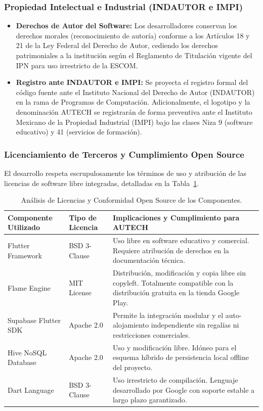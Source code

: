 \subsubsection{Propiedad Intelectual e Industrial (INDAUTOR e IMPI)}
\begin{itemize}
    \item \textbf{Derechos de Autor del Software:} Los desarrolladores conservan los derechos morales (reconocimiento de autoría) conforme a los Artículos 18 y 21 de la Ley Federal del Derecho de Autor, cediendo los derechos patrimoniales a la institución según el Reglamento de Titulación vigente del IPN para uso irrestricto de la ESCOM.
    \item \textbf{Registro ante INDAUTOR e IMPI:} Se proyecta el registro formal del código fuente ante el Instituto Nacional del Derecho de Autor (INDAUTOR) en la rama de Programas de Computación. Adicionalmente, el logotipo y la denominación AUTECH se registrarán de forma preventiva ante el Instituto Mexicano de la Propiedad Industrial (IMPI) bajo las clases Niza 9 (software educativo) y 41 (servicios de formación).
\end{itemize}

\subsubsection{Licenciamiento de Terceros y Cumplimiento Open Source}
El desarrollo respeta escrupulosamente los términos de uso y atribución de las licencias de software libre integradas, detalladas en la Tabla~\ref{tab:licencias_terceros}.

\begin{table}[htbp]
    \centering
    \small
    \caption{Análisis de Licencias y Conformidad Open Source de los Componentes.}
    \label{tab:licencias_terceros}
    \begin{tabular}{l l p{8.5cm}}
        \toprule
        \textbf{Componente Utilizado} & \textbf{Tipo de Licencia} & \textbf{Implicaciones y Cumplimiento para AUTECH} \\
        \midrule
        Flutter Framework & BSD 3-Clause & Uso libre en software educativo y comercial. Requiere atribución de derechos en la documentación técnica. \\
        \addlinespace
        Flame Engine & MIT License & Distribución, modificación y copia libre sin copyleft. Totalmente compatible con la distribución gratuita en la tienda Google Play. \\
        \addlinespace
        Supabase Flutter SDK & Apache 2.0 & Permite la integración modular y el auto-alojamiento independiente sin regalías ni restricciones comerciales. \\
        \addlinespace
        Hive NoSQL Database & Apache 2.0 & Uso y modificación libre. Idóneo para el esquema híbrido de persistencia local offline del proyecto. \\
        \addlinespace
        Dart Language & BSD 3-Clause & Uso irrestricto de compilación. Lenguaje desarrollado por Google con soporte estable a largo plazo garantizado. \\
        \bottomrule
    \end{tabular}
\end{table}

